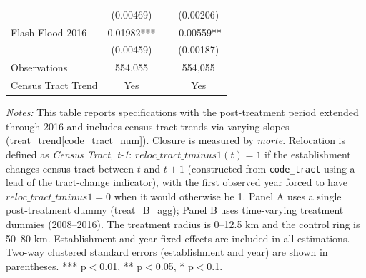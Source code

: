 \begin{supptable}[H]
{\begin{threeparttable}
\begin{tabular}{lccc}
                      & (0.00469) &       & (0.00206)\\
    Flash Flood 2016 & 0.01982*** &       & -0.00559**\\
                      & (0.00459) &       & (0.00187)\\
    Observations & 554{,}055 &       & 554{,}055\\
    Census Tract Trend & Yes &       & Yes\\
    \bottomrule
    \end{tabular}%
   	\begin{tablenotes}[flushleft] \item \small \textit{Notes:} This table reports specifications with the post-treatment period extended through 2016 and includes census tract trends via varying slopes (treat\_trend[code\_tract\_num]). Closure is measured by \textit{morte}. Relocation is defined as \textit{Census Tract, t-1}: $reloc\_tract\_tminus1(t)=1$ if the establishment changes census tract between $t$ and $t+1$ (constructed from \texttt{code\_tract} using a lead of the tract-change indicator), with the first observed year forced to have $reloc\_tract\_tminus1=0$ when it would otherwise be 1. Panel A uses a single post-treatment dummy (treat\_B\_agg); Panel B uses time-varying treatment dummies (2008--2016). The treatment radius is 0--12.5 km and the control ring is 50--80 km. Establishment and year fixed effects are included in all estimations. Two-way clustered standard errors (establishment and year) are shown in parentheses. *** p$<$0.01, ** p$<$0.05, * p$<$0.1.
   	\end{tablenotes}
   	\end{threeparttable}
   	}
\end{supptable}%
